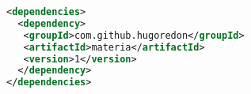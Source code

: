 \begin{lstlisting}[language=XML,morekeywords={repositories,
    repository,id,name,url,groupId,artifactId,dependencies,dependency}]
<dependencies>
  <dependency>
   <groupId>com.github.hugoredon</groupId>
   <artifactId>materia</artifactId>
   <version>1</version>
  </dependency>
</dependencies>
\end{lstlisting}